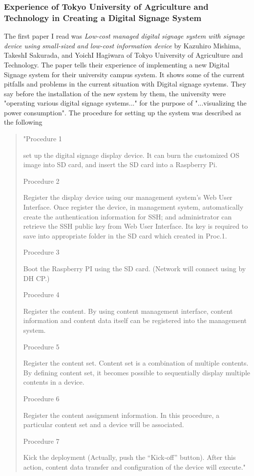 \documentclass{article}
\begin{document}
\subsubsection{Experience of Tokyo University of Agriculture and Technology in Creating a Digital Signage System}
The first paper I read was \textit{Low-cost managed digital signage system with signage device using small-sized and low-cost information device} by Kazuhiro Mishima, TakeshI Sakurada, and YoichI Hagiwara of Tokyo University of Agriculture and Technology.\cite{tokyo}  The paper tells their experience of  implementing a new Digital Signage system for their university campus system. It shows some of the current pitfalls and problems in the current situation with Digital signage systems. They say before the installation of the new system by them, the university were "operating various digital signage systems..." for the purpose of "...visualizing the power consumption"\cite{tokyo}.  The procedure for setting up the system was described as the following
\begin{quote}
"Procedure 1

set up the digital signage display device. It can burn the customized OS image into SD card, and insert the SD card into a Raspberry Pi.

Procedure 2

Register the display device using our management system's Web User Interface. Once register the device, in management system, automatically create the authentication information for SSH; and administrator can retrieve the SSH public key from Web User Interface. Its key is required to save into appropriate folder in the SD card which created in Proc.1.

Procedure 3

Boot the Raspberry PI using the SD card. (Network will connect using by DH CP.)

Procedure 4

Register the content. By using content management interface, content information and content data itself can be registered into the management system.

Procedure 5

Register the content set. Content set is a combination of multiple contents. By defining content set, it becomes possible to sequentially display multiple contents in a device.

Procedure 6

Register the content assignment information. In this procedure, a particular content set and a device will be associated.

Procedure 7

Kick the deployment (Actually, push the “Kick-off” button). After this action, content data transfer and configuration of the device will execute."
\end{quote}
\end{document}
